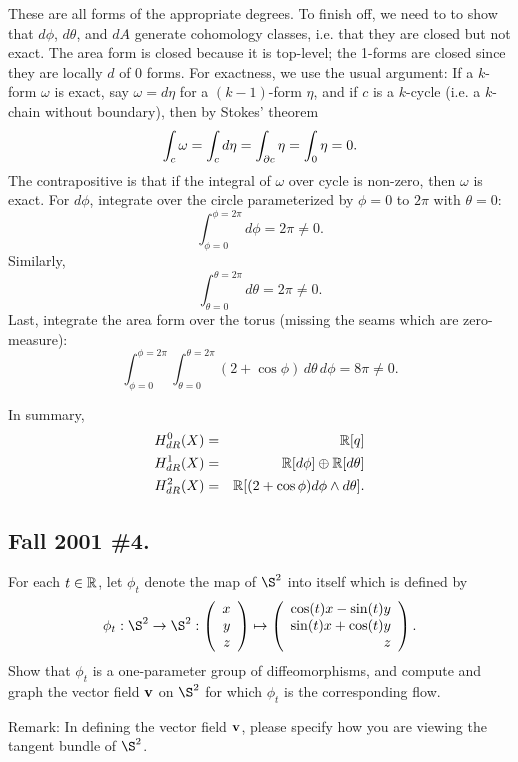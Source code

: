 \documentclass[10pt]{article}
\numberwithin{equation}{subsection}
\begin{document}
These are all forms of the appropriate degrees.  To finish off, we need to to
show that $d\phi$, $d\theta$, and $dA$ generate cohomology classes, i.e. that
they are closed but not exact.  The area form is closed because it is
top-level; the 1-forms are closed since they are locally $d$ of $0$ forms.  For
exactness, we use the usual argument: If a $k$-form $\omega$ is exact, say
$\omega=d\eta$ for a $(k-1)$-form $\eta$, and if $c$ is a $k$-cycle (i.e. a
$k$-chain without boundary), then by Stokes' theorem
$$
	\int_c \omega = \int_c d\eta = \int_{\partial c} \eta = \int_0 \eta = 0.
$$
The contrapositive is that if the integral of $\omega$ over cycle is non-zero,
then $\omega$ is exact.  For $d\phi$, integrate over the circle parameterized
by $\phi=0$ to $2\pi$ with $\theta=0$:
$$
	\int_{\phi=0}^{\phi=2\pi} d\phi = 2\pi \ne 0.
$$
Similarly,
$$
	\int_{\theta=0}^{\theta=2\pi} d\theta = 2\pi \ne 0.
$$
Last, integrate the area form over the torus (missing the seams which are
zero-measure):
$$
	\int_{\phi=0}^{\phi=2\pi}
	\int_{\theta=0}^{\theta=2\pi}
	(2+\cos\phi) \,d\theta\,d\phi
	= 8\pi \ne 0.
$$

In summary,
\begin{eqnarray*}
	H^0_{dR}(X) &=& \mathbb{R}[q]\\
	H^1_{dR}(X) &=& \mathbb{R}[d\phi]\oplus \mathbb{R}[d\theta]\\
	H^2_{dR}(X) &=& \mathbb{R}[(2+\cos\phi)d\phi\wedge d\theta].
\end{eqnarray*}

\subsection{Fall 2001 \#4.}
\label{sec:F01.4}

For each $t \in \mathbb{R}$, let $\phi_t$ denote the map of $\S^2$ into itself which is
defined by
$$
	\phi_t: \S^2 \to \S^2: \colvecthree{x}{y}{z} \mapsto
	\colvecthree{\cos(t)x - \sin(t) y}{\sin(t)x + \cos(t) y}{z}.
$$
Show that $\phi_t$ is a one-parameter group of diffeomorphisms, and compute and
graph the vector field $\mathbf{v}$ on $\S^2$ for which $\phi_t$ is the corresponding
flow.

Remark:  In defining the vector field $\mathbf{v}$, please specify how you are
viewing the tangent bundle of $\S^2$.
\end{document}
